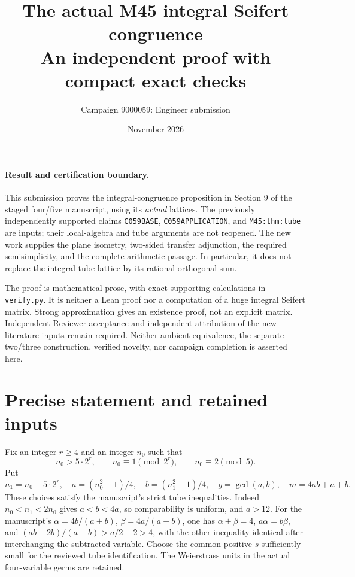 \documentclass[11pt]{article}
\title{The actual M45 integral Seifert congruence\\
An independent proof with compact exact checks}
\author{Campaign 9000059: Engineer submission}
\date{November 2026}
\begin{document}
\maketitle

\paragraph{Result and certification boundary.}
This submission proves the integral-congruence proposition in Section 9
of the staged four/five manuscript, using its \emph{actual} lattices.
The previously independently supported claims \texttt{C059BASE},
\texttt{C059APPLICATION}, and \texttt{M45:thm:tube} are inputs;
their local-algebra and tube arguments are not reopened.
The new work supplies the plane isometry, two-sided transfer adjunction,
the required semisimplicity, and the complete arithmetic passage.
In particular, it does not replace the integral tube lattice by its
rational orthogonal sum.

The proof is mathematical prose, with exact supporting calculations in
\texttt{verify.py}. It is neither a Lean proof nor a computation of a
huge integral Seifert matrix. Strong approximation gives an existence
proof, not an explicit matrix. Independent Reviewer acceptance and
independent attribution of the new literature inputs remain required.
Neither ambient equivalence, the separate two/three construction,
verified novelty, nor campaign completion is asserted here.

\section{Precise statement and retained inputs}

Fix an integer \(r\ge4\) and an integer \(n_0\) such that
\[
 n_0>5\cdot2^r,\qquad n_0\equiv1\pmod{2^r},\qquad n_0\equiv2\pmod5.
\]
Put
\[
 n_1=n_0+5\cdot2^r,\quad
 a=(n_0^2-1)/4,\quad b=(n_1^2-1)/4,\quad
 g=\gcd(a,b),\quad m=4ab+a+b.
\]
These choices satisfy the manuscript's strict tube inequalities.
Indeed \(n_0<n_1<2n_0\) gives \(a<b<4a\), so comparability is
uniform, and \(a>12\). For the manuscript's
\(\alpha=4b/(a+b)\), \(\beta=4a/(a+b)\), one has
\(\alpha+\beta=4\), \(a\alpha=b\beta\), and
\((ab-2b)/(a+b)>a/2-2>4\), with the other inequality identical
after interchanging the subtracted variable. Choose the common positive
\(s\) sufficiently small for the reviewed tube identification.
The Weierstrass units in the actual four-variable germs are retained.
\end{document}

